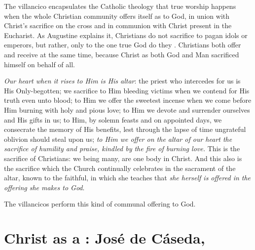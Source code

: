 The villancico encapsulates the Catholic theology that true worship happens
when the whole Christian community offers itself as 
 to God, in union with Christ's sacrifice on the cross and
in communion with Christ present in the Eucharist.
As Augustine explains it, Christians do not sacrifice to pagan idols or
emperors, but rather, only to the one true God do they .%
    \Autocite[10:3]{Augustine:CityofGod}
Christians both offer and receive at the same time, because Christ as both God
and Man sacrificed himself on behalf of all.
\begin{quoting}
    \emph{Our heart when it rises to Him is His altar}: the priest who
    intercedes for us is His Only-begotten; we sacrifice to Him bleeding
    victims when we contend for His truth even unto blood; to Him we offer the
    sweetest incense when we come before Him burning with holy and pious love;
    to Him we devote and surrender ourselves and His gifts in us; to Him, by
    solemn feasts and on appointed days, we consecrate the memory of His
    benefits, lest through the lapse of time ungrateful oblivion should steal
    upon us; \emph{to Him we offer on the altar of our heart the sacrifice of
    humility and praise, kindled by the fire of burning love.}
    This is the sacrifice of Christians: we being many, are one body in Christ.
    And this also is the sacrifice which the Church continually celebrates in
    the sacrament of the altar, known to the faithful, in which she teaches
    that \emph{she herself is offered in the offering she makes to God}.%
        \Autocite[10:6, emphasis added]{Augustine:CityofGod}
\end{quoting}
The  villancicos perform this kind of communal offering
to God.

\section{Christ as a : José de Cáseda, }

